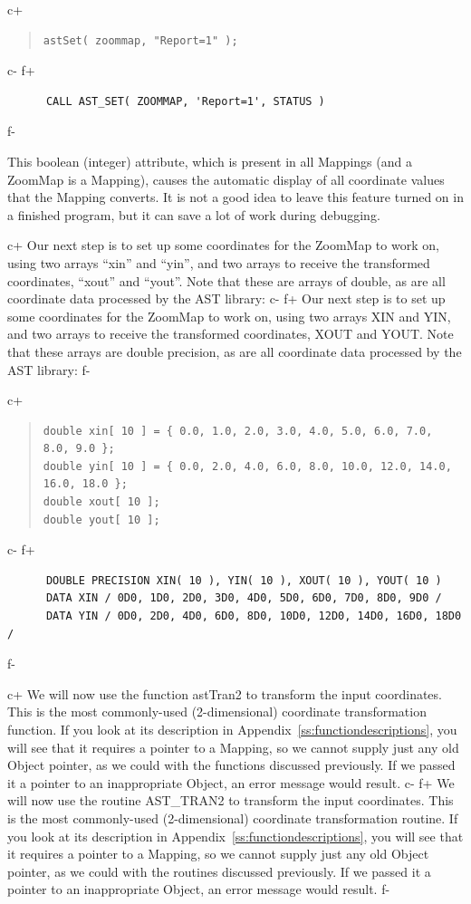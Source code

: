 \documentclass[twoside,11pt]{article}
\newcommand{\appref}[1]{Appendix~\ref{#1}}
\newcommand{\appref}[1]{\ref{#1}}
\begin{document}
c+
\begin{quote}
\small
\begin{verbatim}
astSet( zoommap, "Report=1" );
\end{verbatim}
\normalsize
\end{quote}
c-
f+
\small
\begin{verbatim}
      CALL AST_SET( ZOOMMAP, 'Report=1', STATUS )
\end{verbatim}
\normalsize
f-

This boolean (integer) attribute, which is present in all Mappings
(and a ZoomMap is a Mapping), causes the automatic display of all
coordinate values that the Mapping converts. It is not a good idea to
leave this feature turned on in a finished program, but it can save a
lot of work during debugging.

c+
Our next step is to set up some coordinates for the ZoomMap to work
on, using two arrays ``xin'' and ``yin'', and two arrays to receive
the transformed coordinates, ``xout'' and ``yout''.  Note that these
are arrays of double, as are all coordinate data processed by the AST
library:
c-
f+
Our next step is to set up some coordinates for the ZoomMap to work
on, using two arrays XIN and YIN, and two arrays to receive the
transformed coordinates, XOUT and YOUT.  Note that these arrays are
double precision, as are all coordinate data processed by the AST
library:
f-

c+
\begin{quote}
\small
\begin{verbatim}
double xin[ 10 ] = { 0.0, 1.0, 2.0, 3.0, 4.0, 5.0, 6.0, 7.0, 8.0, 9.0 };
double yin[ 10 ] = { 0.0, 2.0, 4.0, 6.0, 8.0, 10.0, 12.0, 14.0, 16.0, 18.0 };
double xout[ 10 ];
double yout[ 10 ];
\end{verbatim}
\normalsize
\end{quote}
c-
f+
\small
\begin{verbatim}
      DOUBLE PRECISION XIN( 10 ), YIN( 10 ), XOUT( 10 ), YOUT( 10 )
      DATA XIN / 0D0, 1D0, 2D0, 3D0, 4D0, 5D0, 6D0, 7D0, 8D0, 9D0 /
      DATA YIN / 0D0, 2D0, 4D0, 6D0, 8D0, 10D0, 12D0, 14D0, 16D0, 18D0 /
\end{verbatim}
\normalsize
f-

c+
We will now use the function astTran2 to transform the input
coordinates. This is the most commonly-used (2-dimensional) coordinate
transformation function. If you look at its description in
\appref{ss:functiondescriptions}, you will see that it requires a
pointer to a Mapping, so we cannot supply just any old Object pointer,
as we could with the functions discussed previously. If we passed it a
pointer to an inappropriate Object, an error message would result.
c-
f+
We will now use the routine AST\_TRAN2 to transform the input
coordinates. This is the most commonly-used (2-dimensional) coordinate
transformation routine. If you look at its description in
\appref{ss:functiondescriptions}, you will see that it requires a
pointer to a Mapping, so we cannot supply just any old Object pointer,
as we could with the routines discussed previously. If we passed it a
pointer to an inappropriate Object, an error message would result.
f-
\end{document}
